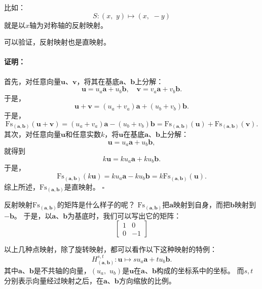 \documentclass[12pt,UTF8]{ctexbook}
\renewenvironment{proof}{\paragraph{\textbf{证明：}}}{\hfill$\square$}
\begin{document}
比如：
$$ S: (x,\,\,y) \mapsto (x,\,\, -y) $$
就是以$x$轴为对称轴的反射映射。

可以验证，反射映射也是直映射。
\begin{proof}
    首先，对任意向量$\mathbf{u}$、$\mathbf{v}$，将其在基底$\mathbf{a}$、$\mathbf{b}$上分解：
    $$ \mathbf{u} = u_a \mathbf{a} + u_b \mathbf{b},\quad \mathbf{v} = v_a \mathbf{a} + v_b \mathbf{b}.$$
    于是，
    $$ \mathbf{u} + \mathbf{v} = (u_a + v_a) \mathbf{a} + (u_b + v_b) \mathbf{b}. $$
    于是，
    $$ \mathrm{Fs}_{(\mathbf{a},\mathbf{b})} (\mathbf{u} + \mathbf{v}) = (u_a + v_a) \mathbf{a} - (u_b + v_b) \mathbf{b} = \mathrm{Fs}_{(\mathbf{a},\mathbf{b})} (\mathbf{u}) + \mathrm{Fs}_{(\mathbf{a},\mathbf{b})} (\mathbf{v}).$$
    其次，对任意向量$\mathbf{u}$和任意实数$k$，将$\mathbf{u}$在基底$\mathbf{a}$、$\mathbf{b}$上分解：
    $$ \mathbf{u} = u_a \mathbf{a} + u_b \mathbf{b},$$
    就得到
    $$ k\mathbf{u} = ku_a \mathbf{a} + ku_b \mathbf{b}.$$
    于是，
    $$ \mathrm{Fs}_{(\mathbf{a},\mathbf{b})} (k\mathbf{u}) = ku_a \mathbf{a} - ku_b \mathbf{b} = k \mathrm{Fs}_{(\mathbf{a},\mathbf{b})} (\mathbf{u}). $$
    综上所述，$\mathrm{Fs}_{(\mathbf{a},\mathbf{b})}$是直映射。
\end{proof}

反射映射$\mathrm{Fs}_{(\mathbf{a},\mathbf{b})}$的矩阵是什么样子的呢？
$\mathrm{Fs}_{(\mathbf{a},\mathbf{b})}$把$\mathbf{a}$映射到自身，而把$\mathbf{b}$映射到$-\mathbf{b}$。
于是，以$\mathbf{a}$、$\mathbf{b}$为基底时，我们可以写出它的矩阵：
$$
\begin{bmatrix}
    1 & 0 \\ 0 & -1
\end{bmatrix}
$$

以上几种点映射，除了旋转映射，都可以看作以下这种映射的特例：
$$ H_{(\mathbf{a},\mathbf{b})}^{s, t}: \mathbf{u} \mapsto su_a\mathbf{a} + tu_b\mathbf{b}.$$
其中$\mathbf{a}$、$\mathbf{b}$是不共轴的向量，$(u_a,\,\,u_b)$是$\mathbf{u}$在$\mathbf{a}$、$\mathbf{b}$构成的坐标系中的坐标。
而$s,t$分别表示向量经过映射之后，在$\mathbf{a}$、$\mathbf{b}$方向缩放的比例。
\end{document}
